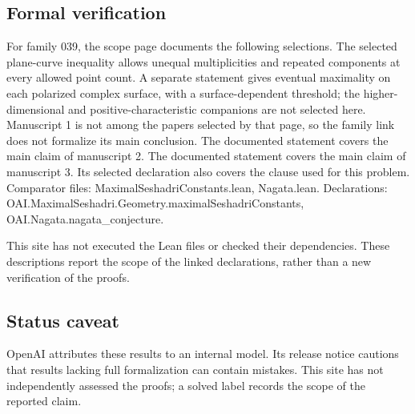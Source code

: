 \documentclass[11pt]{article}
\begin{document}
\subsection{Formal verification}
For family 039, the scope page documents the following selections. The selected plane-curve inequality allows unequal multiplicities and repeated components at every allowed point count. A separate statement gives eventual maximality on each polarized complex surface, with a surface-dependent threshold; the higher-dimensional and positive-characteristic companions are not selected here. Manuscript 1 is not among the papers selected by that page, so the family link does not formalize its main conclusion. The documented statement covers the main claim of manuscript 2. The documented statement covers the main claim of manuscript 3. Its selected declaration also covers the clause used for this problem. Comparator files: MaximalSeshadriConstants.lean, Nagata.lean. Declarations: OAI.MaximalSeshadri.Geometry.maximalSeshadriConstants, OAI.Nagata.nagata\_conjecture.

This site has not executed the Lean files or checked their dependencies. These descriptions report the scope of the linked declarations, rather than a new verification of the proofs.

\subsection{Status caveat}
OpenAI attributes these results to an internal model. Its release notice cautions that results lacking full formalization can contain mistakes. This site has not independently assessed the proofs; a solved label records the scope of the reported claim.
\end{document}
